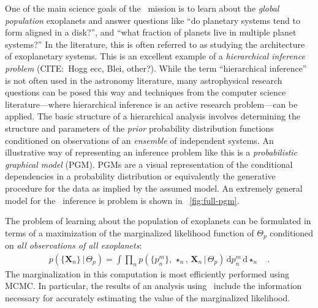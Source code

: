 \documentclass[letterpaper,12pt,preprint]{hack_aastex}
\newcommand{\Bart}{\package{Bart}}
\newcommand{\dd}{\,\mathrm{d}}
\begin{document}
One of the main science goals of the \Kepler\ mission is to learn about the
\emph{global population} exoplanets and answer questions like ``do planetary
systems tend to form aligned in a disk?'', and ``what fraction of planets live
in multiple planet systems?''
In the literature, this is often referred to as studying the architecture of
exoplanetary systems.
This is an excellent example of a \emph{hierarchical inference problem}
 (CITE:\ Hogg ecc, Blei, other?).
While the term ``hierarchical inference'' is not often used in the astronomy
literature, many astrophysical research questions can be posed this way and
techniques from the computer science literature---where hierarchical inference
is an active research problem---can be applied.
The basic structure of a hierarchical analysis involves determining the
structure and parameters of the \emph{prior} probability distribution
functions conditioned on observations of an \emph{ensemble} of independent
systems.
An illustrative way of representing an inference problem like this is a
\emph{probabilistic graphical model} (PGM).
PGMs are a visual representation of the conditional dependencies in a
probability distribution or equivalently the generative procedure for the data
as implied by the assumed model.
An extremely general model for the \Kepler\ inference is problem is shown in
\figurename~\ref{fig:full-pgm}.

The problem of learning about the population of exoplanets can be formulated
in terms of a maximization of the marginalized likelihood function of
$\Theta_p$ conditioned on \emph{all observations of all exoplanets}:
\begin{eqnarray}
p(\{\mathbf{X}_n\}\,|\,\Theta_p) = \int \prod_{n}
p(\{p_n^m\},\,\star_n,\,\mathbf{X}_n\,|\,\Theta_p)
\dd p_n^m \dd\!\star_n\quad.
\end{eqnarray}
The marginalization in this computation is most efficiently performed using
MCMC.
In particular, the results of an analysis using \Bart\ include the information
necessary for accurately estimating the value of the marginalized likelihood.
\end{document}

